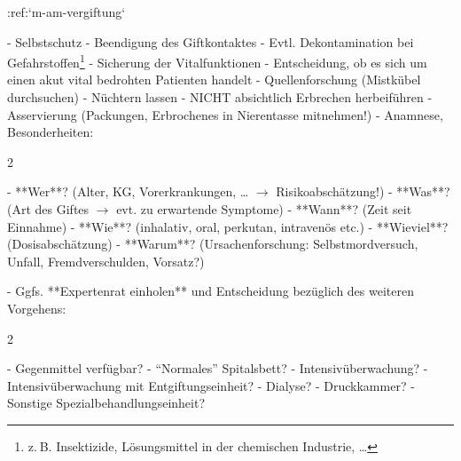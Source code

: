 :ref:`m-am-vergiftung`
\begin{enumerate}
  -   Selbstschutz
  -   Beendigung des Giftkontaktes
  -   Evtl. Dekontamination bei
  Gefahrstoffen\footnote{z. B. Insektizide, Lösungsmittel
  in der chemischen Industrie, \ldots}
  -   Sicherung der Vitalfunktionen
  -   Entscheidung, ob es sich um einen akut vital
  bedrohten Patienten handelt
  -   Quellenforschung (Mistkübel
  durchsuchen)
  -   Nüchtern lassen
  -   NICHT absichtlich Erbrechen
  herbeiführen
  -   Asservierung (Packungen, Erbrochenes in
  Nierentasse mitnehmen!)
  -   Anamnese, Besonderheiten:
  \begin{multicols}{2}
  \begin{enumerate}\raggedbottom
    -   **Wer**? (Alter, KG, Vorerkrankungen, \ldots
    $\rightarrow$ Risikoabschätzung!)
    -   **Was**? (Art des Giftes $\rightarrow$ evt.
    zu erwartende Symptome)
    -   **Wann**? (Zeit seit Einnahme)
    -   **Wie**?
    (inhalativ, oral, perkutan, intravenös etc.)
    -   **Wieviel**? (Dosisabschätzung)
    -   **Warum**? (Ursachenforschung:
    Selbst\-mord\-ver\-such, Unfall, Fremdverschulden,
    Vorsatz?)
  \end{enumerate}
  \end{multicols}
  -   Ggfs. **Expertenrat einholen** und Entscheidung
  bezüglich des weiteren Vorgehens:
  \begin{multicols}{2}
  \begin{enumerate}\raggedbottom
    -   Gegenmittel verfügbar?
    -   \enquote{Normales} Spitalsbett?
    -   Intensivüberwachung?
    -   Intensivüberwachung mit Entgiftungseinheit?
    -   Dialyse?
    -   Druckkammer?
    -   Sonstige Spezialbehandlungseinheit?
  \end{enumerate}
  \end{multicols}
\end{enumerate}